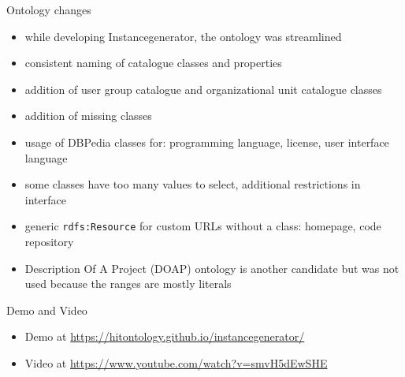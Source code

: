 \documentclass[aspectratio=1610]{beamer}
\begin{document}
\begin{frame}{Ontology changes}
\begin{itemize}
\item while developing Instancegenerator, the ontology was streamlined
\item consistent naming of catalogue classes and properties
\item addition of user group catalogue and organizational unit catalogue classes
\item addition of missing classes
\item usage of DBPedia classes for: programming language, license, user interface language 
\item some classes have too many values to select, additional restrictions in interface
\item generic \texttt{rdfs:Resource} for custom URLs without a class: homepage, code repository
\item Description Of A Project (DOAP) ontology is another candidate but was not used because the ranges are mostly literals 
\end{itemize}
\end{frame}

\begin{frame}{Demo and Video}
\begin{itemize}
\item Demo at \url{https://hitontology.github.io/instancegenerator/}
\item Video at \url{https://www.youtube.com/watch?v=smvH5dEwSHE}
\end{itemize}
\end{frame}
\end{document}
